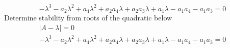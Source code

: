 \documentclass[12pt]{article}
\begin{document}
			\begin{equation}
				-\lambda^3-a_2\lambda^2+a_4\lambda^2+a_2a_4\lambda+a_2a_3\lambda+a_1\lambda-a_1a_4-a_1a_3 = 0
			\end{equation}
			Determine stability from roots of the quadratic below
			\begin{equation}
				\boxed{
				\begin{matrix}
					|A - \lambda| = 0 \\
					-\lambda^3-a_2\lambda^2+a_4\lambda^2+a_2a_4\lambda+a_2a_3\lambda+a_1\lambda-a_1a_4-a_1a_3 = 0
				\end{matrix}
				}	
			\end{equation}
\end{document}
